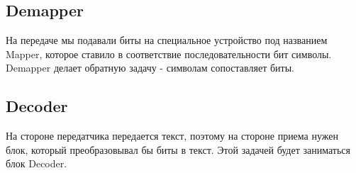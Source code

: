 \subsection{Demapper}

На передаче мы подавали биты на специальное устройство под названием Mapper, которое ставило в соответствие последовательности бит
символы. Demapper делает обратную задачу - символам сопоставляет биты.

\subsection{Decoder}

На стороне передатчика передается текст, поэтому на стороне приема нужен блок, который преобразовывал бы биты в текст. Этой задачей
будет заниматься блок Decoder.

\endinput
